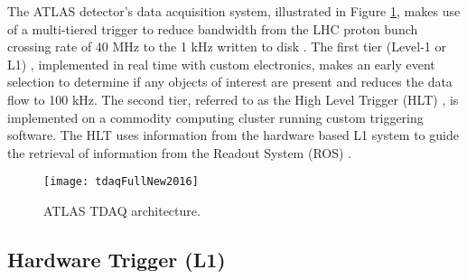 The ATLAS  detector's data acquisition system, illustrated in Figure \ref{fig:tdaq_diagram}, makes use of a multi-tiered trigger to reduce 
bandwidth from the LHC proton bunch crossing rate of 40 MHz
to the 1 kHz written to disk \cite{evolution1,evolution2}. The first tier (Level-1 or L1) \cite{l1}, implemented in real time with custom electronics, 
makes an early event selection to determine if any objects of interest are present and reduces the data flow to 
100 kHz. The second tier, referred to as the High Level Trigger (HLT) \cite{hlt}, is implemented on a commodity computing cluster running custom triggering software. The HLT uses information from the
hardware based L1 system to guide the retrieval of information from the Readout System (ROS) \cite{ros}. 

\begin{figure}[!t]
\centering
\texttt{[image: tdaqFullNew2016]}
\vspace{-0.5cm}
\caption{ATLAS TDAQ architecture.}
\label{fig:tdaq_diagram}
\end{figure} 

\subsection{Hardware Trigger (L1)}


